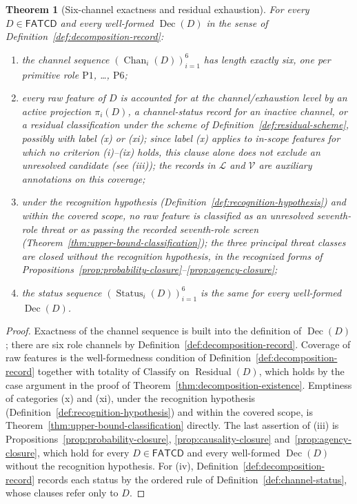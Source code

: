 \documentclass[11pt]{article}
\newtheorem{theorem}{Theorem}[section]
\theoremstyle{definition}
\newcommand{\FATCD}{\ensuremath{\mathsf{FATCD}}}
\newcommand{\Dec}[1]{\ensuremath{\operatorname{Dec}\!\left(#1\right)}}
\newcommand{\Residual}[1]{\ensuremath{\operatorname{Residual}\!\left(#1\right)}}
\newcommand{\Chan}[2]{\ensuremath{\operatorname{Chan}_{#1}\!\left(#2\right)}}
\newcommand{\Status}[2]{\ensuremath{\operatorname{Status}_{#1}\!\left(#2\right)}}
\newcommand{\Pone}{\ensuremath{\mathrm{P1}}}
\newcommand{\Psix}{\ensuremath{\mathrm{P6}}}
\begin{document}
\begin{theorem}[Six-channel exactness and residual exhaustion]\label{thm:six-channel-exactness}
For every \(D \in \FATCD{}\) and every well-formed
\(\Dec{D}\) in the sense of
Definition~\ref{def:decomposition-record}:
\begin{enumerate}[label=(\roman*),topsep=2pt,itemsep=1pt]
  \item the channel sequence \((\Chan{i}{D})_{i=1}^{6}\) has length
    exactly six, one per primitive role \Pone{}, \ldots, \Psix{};
  \item every raw feature of \(D\) is accounted for at the
    channel/exhaustion level by an active projection \(\pi_i(D)\), a
    channel-status record for an inactive channel, or a residual
    classification under the scheme of
    Definition~\ref{def:residual-scheme}, possibly with label (x) or (xi);
    since label (x) applies to in-scope features for which no criterion
    (i)--(ix) holds, this clause alone does not exclude an unresolved
    candidate (see (iii)); the records in \(\mathcal{L}\)
    and \(\mathcal{V}\) are auxiliary annotations on this coverage;
  \item under the recognition hypothesis
    (Definition~\ref{def:recognition-hypothesis}) and within the covered scope,
    no raw feature is classified as an unresolved seventh-role threat or as
    passing the recorded seventh-role screen
    (Theorem~\ref{thm:upper-bound-classification}); the three principal threat
    classes are closed without the recognition hypothesis, in the
    recognized forms of
    Propositions~\ref{prop:probability-closure}--\ref{prop:agency-closure};
  \item the status sequence \((\Status{i}{D})_{i=1}^{6}\) is the same for every
    well-formed \(\Dec{D}\).
\end{enumerate}
\end{theorem}

\begin{proof}
Exactness of the channel sequence is built into the definition of
\(\Dec{D}\); there are six role channels by
Definition~\ref{def:decomposition-record}. Coverage of raw features is
the well-formedness condition of
Definition~\ref{def:decomposition-record} together with totality of
\(\mathrm{Classify}\) on \(\Residual{D}\), which holds by the case argument in
the proof of Theorem~\ref{thm:decomposition-existence}. Emptiness of categories (x) and (xi),
under the recognition hypothesis (Definition~\ref{def:recognition-hypothesis})
and within the covered scope, is
Theorem~\ref{thm:upper-bound-classification} directly. The last assertion of
(iii) is Propositions~\ref{prop:probability-closure},
\ref{prop:causality-closure} and~\ref{prop:agency-closure}, which hold for
every \(D\in\FATCD{}\) and every well-formed \(\Dec{D}\) without the
recognition hypothesis. For (iv), Definition~\ref{def:decomposition-record}
records each status by the ordered rule of Definition~\ref{def:channel-status},
whose clauses refer only to \(D\).
\end{proof}
\end{document}
